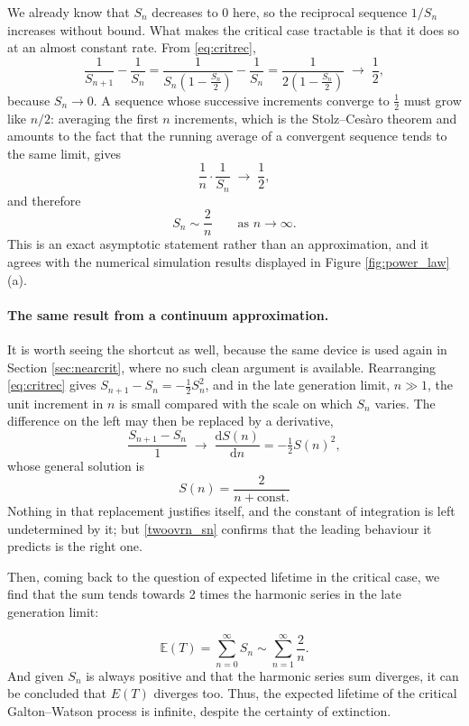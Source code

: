 \documentclass[11pt]{article}
\begin{document}
We already know that $S_n$ decreases to $0$ here, so the reciprocal sequence $1/S_n$ increases without bound. What makes the critical case tractable is that it does so at an almost constant rate. From \eqref{eq:critrec},
\begin{equation}
\frac{1}{S_{n+1}} - \frac{1}{S_n}
=
\frac{1}{S_n\left(1 - \frac{S_n}{2}\right)} - \frac{1}{S_n}
=
\frac{1}{2\left(1 - \frac{S_n}{2}\right)}
\;\longrightarrow\;
\frac{1}{2},
\label{eq:recincrement}
\end{equation}
because $S_n \to 0$. A sequence whose successive increments converge to $\tfrac12$ must grow like $n/2$: averaging the first $n$ increments, which is the Stolz--Ces\`aro theorem and amounts to the fact that the running average of a convergent sequence tends to the same limit, gives
\[
\frac{1}{n}\cdot\frac{1}{S_n} \;\longrightarrow\; \frac{1}{2},
\]
and therefore
\begin{equation}
S_n \sim \frac{2}{n}
\qquad \text{as } n \to \infty. \label{twoovrn_sn}
\end{equation}
This is an exact asymptotic statement rather than an approximation, and it agrees with the numerical simulation results displayed in Figure \ref{fig:power_law}(a).

\paragraph{The same result from a continuum approximation.}
It is worth seeing the shortcut as well, because the same device is used again in Section \ref{sec:nearcrit}, where no such clean argument is available. Rearranging \eqref{eq:critrec} gives $S_{n+1} - S_n = -\tfrac12 S_n^2$, and in the late generation limit, $n \gg 1$, the unit increment in $n$ is small compared with the scale on which $S_n$ varies. The difference on the left may then be replaced by a derivative,
$$\frac{S_{n+1} - S_n}{1} \;\rightarrow\; \frac{\mathrm{d}S(n)}{\mathrm{d} n}  = -\tfrac{1}{2} S(n)^2,$$
whose general solution is
$$S(n) = \frac{2}{n + \text{const.}}$$
Nothing in that replacement justifies itself, and the constant of integration is left undetermined by it; but \eqref{twoovrn_sn} confirms that the leading behaviour it predicts is the right one.

Then, coming back to the question of expected lifetime in the critical case, we find that the sum tends towards 2 times the harmonic series in the late generation limit:

$$\mathbb{E}(T) = \sum_{n=0}^{\infty} S_n \sim \sum_{n=1}^{\infty} \frac{2}{n}.$$
And given $S_n$ is always positive and that the harmonic series sum diverges, it can be concluded that $E(T)$ diverges too. Thus, the expected lifetime of the critical Galton--Watson process is infinite, despite the certainty of extinction.
\end{document}

